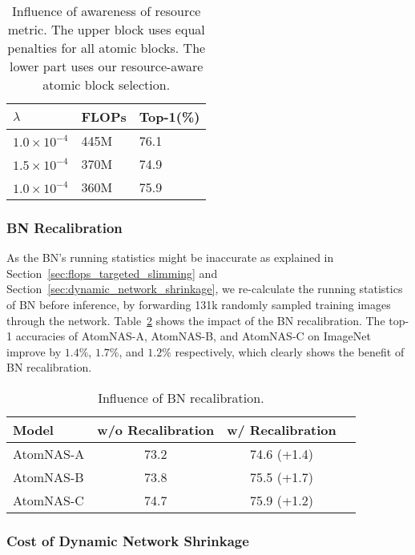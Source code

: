 \documentclass{article} \usepackage{iclr2020_conference,times}
\newcommand{\flops}{FLOPs\xspace}
\begin{document}
\begin{table}[htb]
\caption{Influence of awareness of resource metric. The upper block uses equal penalties for all atomic blocks. The lower part uses our resource-aware atomic block selection.}
\begin{center}
\begin{tabular}{lll}
\toprule
$\lambda$ & \flops & Top-1(\%) \\
\midrule
$1.0 \times 10^{-4}$ & 445M & 76.1 \\
$1.5 \times 10^{-4}$ & 370M & 74.9 \\
\midrule
$1.0 \times 10^{-4}$ & 360M & 75.9 \\
\bottomrule
\end{tabular}
\end{center}
\label{tab:equal_baseline}
\end{table}

\subsubsection{BN Recalibration}

As the BN's running statistics might be inaccurate as explained in Section~\ref{sec:flops_targeted_slimming} and Section~\ref{sec:dynamic_network_shrinkage}, we re-calculate the running statistics of BN before inference, by forwarding 131k randomly sampled training images through the network. Table~\ref{tab:bn_calib} shows the impact of the BN recalibration. The top-1 accuracies of AtomNAS-A, AtomNAS-B, and AtomNAS-C on ImageNet improve by $1.4\%$, $1.7\%$, and $1.2\%$ respectively, which clearly shows the benefit of BN recalibration. 




\begin{table}[htb]
\caption{Influence of BN recalibration.}
\begin{center}
\begin{tabular}{lccc}
\toprule
Model   & w/o Recalibration & w/ Recalibration\\
\midrule
AtomNAS-A  & 73.2 & 74.6 (+1.4) \\
AtomNAS-B  & 73.8 & 75.5 (+1.7) \\
AtomNAS-C  & 74.7 & 75.9 (+1.2) \\
\bottomrule
\end{tabular}
\end{center}
\label{tab:bn_calib}
\end{table}

\subsubsection{Cost of Dynamic Network Shrinkage}
\label{ssub:search_cost}
\end{document}
